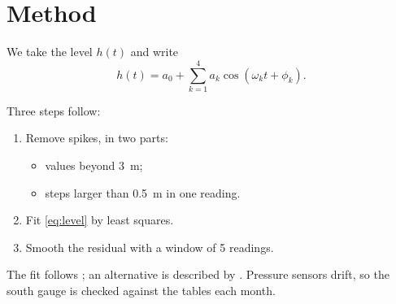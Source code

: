 \section{Method}\label{sec:method}
We take the level $h(t)$ and write
\begin{equation}\label{eq:level}
  h(t) = a_0 + \sum_{k=1}^{4} a_k \cos(\omega_k t + \phi_k).
\end{equation}

Three steps follow:
\begin{enumerate}
  \item Remove spikes, in two parts:
    \begin{itemize}
      \item values beyond \SI{3}{\metre};
      \item steps larger than \SI{0.5}{\metre} in one reading.
    \end{itemize}
  \item Fit \cref{eq:level} by least squares.
  \item Smooth the residual with a window of \num{5} readings.
\end{enumerate}

The fit follows \citep{harbour94}; an alternative is described by
\citealp{inlet07}. Pressure sensors drift, so the south gauge is checked
against the tables each month.
